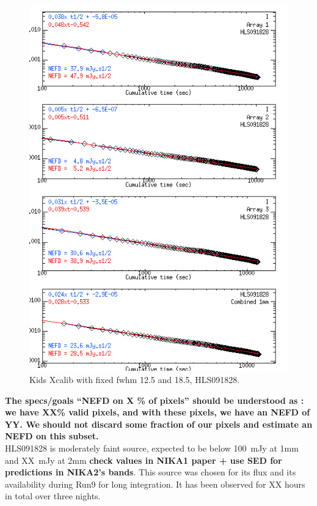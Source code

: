 \documentclass[a4paper, 11pt]{article} %
\begin{document}
\begin{figure}
\begin{center}
\includegraphics[clip, angle=0, scale = 0.5]{Figures/NEFD_HLS091828_20170226s415_FXDC0C1_GaussPhot.png}
\caption{Kids Xcalib with fixed fwhm 12.5 and 18.5, HLS091828.}
\label{fig:nefd_vs_t}
\end{center}
\end{figure}

{\bf The specs/goals ``NEFD on X \% of pixels'' should be understood as : we have
XX\% valid pixels, and with these pixels, we have an NEFD of YY. We should not
discard some fraction of our pixels and estimate an NEFD on this subset.}\\

HLS091828 is moderately faint source, expected to be below 100~mJy at 1mm and
XX~mJy at 2mm {\bf check values in NIKA1 paper + use SED for predictions in
  NIKA2's bands}. This source was chosen for its flux and its availability during
Run9 for long integration. It has been observed for XX hours in total over three
nights.
\end{document}
